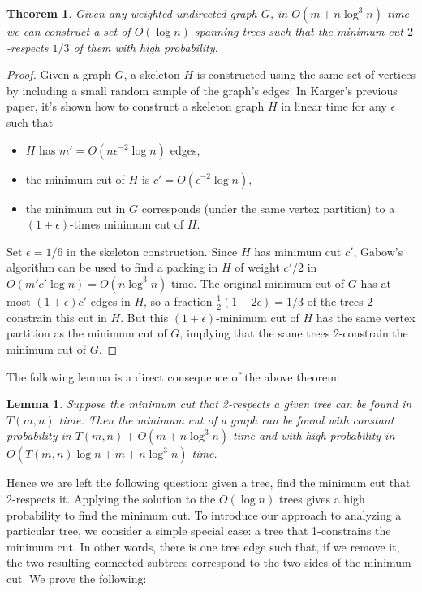 \documentclass[11pt]{article}
\theoremstyle{plain}
\newtheorem{lemma}{Lemma}[section]
\newtheorem{theorem}{Theorem}[section]
\begin{document}
\begin{theorem}
    \label{theorem:2respect}
    Given any weighted undirected graph $G$, in $O(m+n\log^3 n)$ time we can construct a set of $O(\log n)$ spanning trees such that the minimum cut $2$-respects $1/3$ of them with high probability.
\end{theorem}

\begin{proof}
    Given a graph $G$, a skeleton $H$ is constructed using the same set of vertices by including a small random sample of the graph's edges. In Karger's previous paper\cite{karger1994random}, it's shown how to construct a skeleton graph $H$ in linear time for any $\epsilon$ such that
    \begin{itemize}
    \item $H$ has $m' = O(n\epsilon^{-2}\log n)$ edges,
    \item the minimum cut of $H$ is $c' = O(\epsilon^{-2}\log n)$,
    \item the minimum cut in $G$ corresponds (under the same vertex
      partition) to a $(1+\epsilon)$-times minimum cut of $H$.
    \end{itemize}
    Set $\epsilon=1/6$ in the skeleton construction.  Since $H$ has
    minimum cut $c'$, Gabow's algorithm\cite{gabow1991faster} can be used to find a packing in $H$ of weight $c'/2$ in $O(m'c'\log n)=O(n\log^3 n)$ time.  The original minimum cut of $G$ has at most $(1 +\epsilon)c'$ edges in $H$, so a fraction $\frac12(1-2\epsilon)=1/3$ of the trees $2$-constrain this cut in $H$.  But this $(1+\epsilon)$-minimum cut of $H$ has the same vertex partition as the minimum cut of $G$, implying that the same trees $2$-constrain the minimum cut of $G$.
\end{proof}

The following lemma is a direct consequence of the above theorem:
\begin{lemma}
    \label{lemma:2respect}
    Suppose the minimum cut that 2-respects a given tree can be found in $T(m,n)$ time.  Then the minimum cut of a graph can be found with constant probability in $T(m,n)+O(m+n\log^3 n)$ time and with high probability in $O(T(m,n)\log n+m+n\log^3 n)$ time.
\end{lemma}

Hence we are left the following question: given a tree, find the minimum cut that 2-respects it. Applying the solution to the $O(\log n)$ trees gives a high probability to find the minimum cut. To introduce our approach to analyzing a particular tree, we consider a simple special case: a tree that 1-constrains the minimum cut. In other words, there is one tree edge such that, if we remove it, the two resulting connected subtrees correspond to the two sides of the minimum cut. We prove the following:
\end{document}
